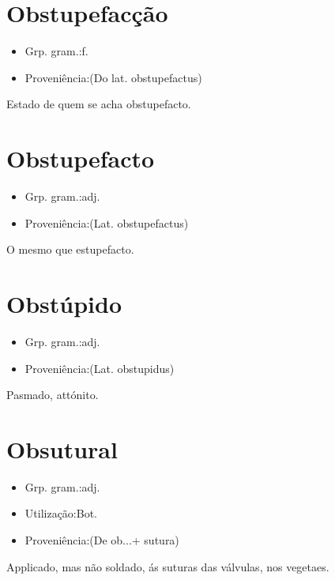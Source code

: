 \section{Obstupefacção}
\begin{itemize}
\item {Grp. gram.:f.}
\end{itemize}
\begin{itemize}
\item {Proveniência:(Do lat. \textunderscore obstupefactus\textunderscore )}
\end{itemize}
Estado de quem se acha obstupefacto.
\section{Obstupefacto}
\begin{itemize}
\item {Grp. gram.:adj.}
\end{itemize}
\begin{itemize}
\item {Proveniência:(Lat. \textunderscore obstupefactus\textunderscore )}
\end{itemize}
O mesmo que \textunderscore estupefacto\textunderscore .
\section{Obstúpido}
\begin{itemize}
\item {Grp. gram.:adj.}
\end{itemize}
\begin{itemize}
\item {Proveniência:(Lat. \textunderscore obstupidus\textunderscore )}
\end{itemize}
Pasmado, attónito.
\section{Obsutural}
\begin{itemize}
\item {Grp. gram.:adj.}
\end{itemize}
\begin{itemize}
\item {Utilização:Bot.}
\end{itemize}
\begin{itemize}
\item {Proveniência:(De \textunderscore ob...\textunderscore  + \textunderscore sutura\textunderscore )}
\end{itemize}
Applicado, mas não soldado, ás suturas das válvulas, nos vegetaes.
